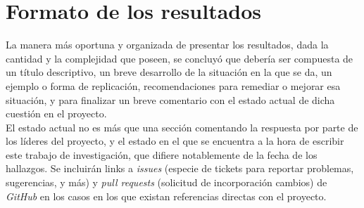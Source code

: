 \section{Formato de los resultados}
La manera más oportuna y organizada de presentar los resultados, dada la cantidad y la complejidad que poseen, se concluyó que debería ser compuesta de un título descriptivo, un breve desarrollo de la situación en la que se da, un ejemplo o forma de replicación, recomendaciones para remediar o mejorar esa situación, y para finalizar un breve comentario con el estado actual de dicha cuestión en el proyecto.\\

El estado actual no es más que una sección comentando la respuesta por parte de los líderes del proyecto, y el estado en el que se encuentra a la hora de escribir este trabajo de investigación, que difiere notablemente de la fecha de los hallazgos. Se incluirán links a \textit{issues} (especie de tickets para reportar problemas, sugerencias, y más) y \textit{pull requests} (solicitud de incorporación cambios) de \textit{GitHub} en los casos en los que existan referencias directas con el proyecto.

